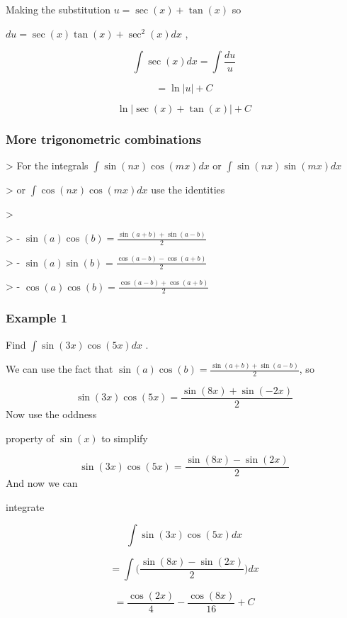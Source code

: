 Making the substitution $u=\sec(x)+\tan(x)$ so

$du=\sec(x)\tan(x)+\sec^2(x)dx$ ,


\[
\int\sec(x)dx=\int\frac{du}{u}
\]

 \[
=\ln|u|+C
\]

\[
\ln\Big|\sec(x)+\tan(x)\Big|+C
\]


\subsubsection{More trigonometric combinations}
\label{sss:more-dab8}


> For the integrals $\int\sin(nx)\cos(mx)dx$ or $\int\sin(nx)\sin(mx)dx$

> or $\int\cos(nx)\cos(mx)dx$ use the identities

>

> -   $\sin(a)\cos(b)=\frac{\sin(a+b)+\sin(a-b)}{2}$

> -   $\sin(a)\sin(b)=\frac{\cos(a-b)-\cos(a+b)}{2}$

> -   $\cos(a)\cos(b)=\frac{\cos(a-b)+\cos(a+b)}{2}$


\subsubsection{Example 1}
\label{sss:exam-acc3}


Find $\int\sin(3x)\cos(5x)dx$ .


We can use the fact that $\sin(a)\cos(b)=\frac{\sin(a+b)+\sin(a-b)}{2}$, so


\[
\sin(3x)\cos(5x)=\frac{\sin(8x)+\sin(-2x)}{2}
\] Now use the oddness

property of $\sin(x)$ to simplify


\[
\sin(3x)\cos(5x)=\frac{\sin(8x)-\sin(2x)}{2}
\] And now we can

integrate


\[
\int\sin(3x)\cos(5x)dx
\]

\[
=\int\Big(\frac{\sin(8x)-\sin(2x)}{2}\Big)dx
\]

\[
=\frac{\cos(2x)}{4}-\frac{\cos(8x)}{16}+C
\]


